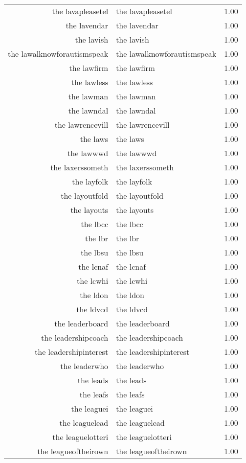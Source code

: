 \begin{table}[ht]
\begin{tabular}{rlr}
  the lavapleasetel & the lavapleasetel & 1.00 \\ 
  the lavendar & the lavendar & 1.00 \\ 
  the lavish & the lavish & 1.00 \\ 
  the lawalknowforautismspeak & the lawalknowforautismspeak & 1.00 \\ 
  the lawfirm & the lawfirm & 1.00 \\ 
  the lawless & the lawless & 1.00 \\ 
  the lawman & the lawman & 1.00 \\ 
  the lawndal & the lawndal & 1.00 \\ 
  the lawrencevill & the lawrencevill & 1.00 \\ 
  the laws & the laws & 1.00 \\ 
  the lawwwd & the lawwwd & 1.00 \\ 
  the laxerssometh & the laxerssometh & 1.00 \\ 
  the layfolk & the layfolk & 1.00 \\ 
  the layoutfold & the layoutfold & 1.00 \\ 
  the layouts & the layouts & 1.00 \\ 
  the lbcc & the lbcc & 1.00 \\ 
  the lbr & the lbr & 1.00 \\ 
  the lbsu & the lbsu & 1.00 \\ 
  the lcnaf & the lcnaf & 1.00 \\ 
  the lcwhi & the lcwhi & 1.00 \\ 
  the ldon & the ldon & 1.00 \\ 
  the ldvcd & the ldvcd & 1.00 \\ 
  the leaderboard & the leaderboard & 1.00 \\ 
  the leadershipcoach & the leadershipcoach & 1.00 \\ 
  the leadershipinterest & the leadershipinterest & 1.00 \\ 
  the leaderwho & the leaderwho & 1.00 \\ 
  the leads & the leads & 1.00 \\ 
  the leafs & the leafs & 1.00 \\ 
  the leaguei & the leaguei & 1.00 \\ 
  the leaguelead & the leaguelead & 1.00 \\ 
  the leaguelotteri & the leaguelotteri & 1.00 \\ 
  the leagueoftheirown & the leagueoftheirown & 1.00 \\ 

\end{tabular}
\end{table}
